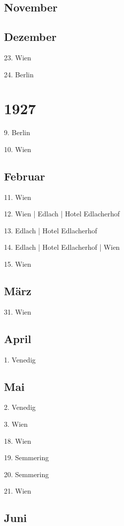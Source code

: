 \documentclass[twoside=false,titlepage=false,open=any, parskip=never, fontsize=10pt, headings=small, chapterprefix=false, appendixprefix=false, DIV=15]{scrbook}
\begin{document}
\begin{multicols}{3}
            \section*{November}
            \section*{Dezember}
            23. Wien\par
            24. Berlin\par
            \chapter*{1927}
            9. Berlin\par
            10. Wien\par
            \section*{Februar}
            11. Wien\par
            12. Wien | Edlach | Hotel Edlacherhof\par
            13. Edlach | Hotel Edlacherhof\par
            14. Edlach | Hotel Edlacherhof | Wien\par
            15. Wien\par
            \section*{März}
            31. Wien\par
            \section*{April}
            1. Venedig\par
            \section*{Mai}
            2. Venedig\par
            3. Wien\par
            18. Wien\par
            19. Semmering\par
            20. Semmering\par
            21. Wien\par
            \section*{Juni}

\end{multicols}
\end{document}
